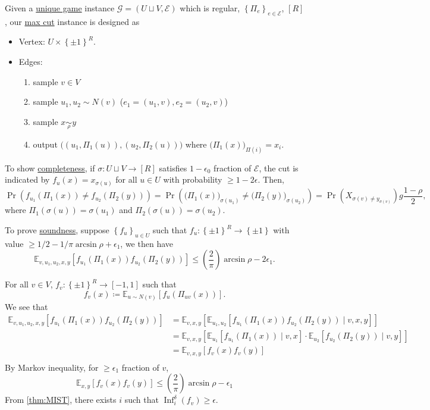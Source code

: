 Given a \hyperref[prb:unique-game]{unique game} instance \(\mathcal{G} = (U \sqcup V , \mathcal{E} )\) which is regular, \(\left\{ \Pi _e \right\}_{e\in \mathcal{E} } \), \([R]\), our \hyperref[prb:max-cut]{max cut} instance is designed as
\begin{itemize}
	\item Vertex: \(U \times \left\{ \pm 1 \right\} ^R\).
	\item Edges:
	      \begin{enumerate}
		      \item sample \(v\in V\)
		      \item sample \(u_1, u_2 \sim N(v)\) (\(e_1 = (u_1, v), e_2 = (u_2, v)\))
		      \item sample \(x \underset{\rho }{\sim } y\)
		      \item output \(\big( (u_1, \Pi _1(u)), (u_2, \Pi _2(u))\big)\) where \(\big(\Pi _1(x)\big)_{\Pi (i)} = x_i\).
	      \end{enumerate}
\end{itemize}

To show \hyperref[def:completeness]{completeness}, if \(\sigma \colon U \sqcup V \to [R]\) satisfies \(1 - \epsilon _0\) fraction of \(\mathcal{E} \), the cut is indicated by \(f_u(x) = x_{\sigma (u)}\) for all \(u\in U\) with probability \(\geq 1 - 2 \epsilon \). Then,
\[
	\Pr_{}(f_{u_1}(\Pi _1(x)) \neq f_{u_2}(\Pi _2(y)))
	= \Pr_{}(\big(\Pi _1(x)\big)_{\sigma (u_1)} \neq \big(\Pi _2(y)\big)_{\sigma (u_2)})
	= \Pr_{}(X_{\sigma (v) \neq y_{\sigma (v)}})
	g \frac{1-\rho }{2},
\]
where \(\Pi _1(\sigma (u)) = \sigma (u_1)\) and \(\Pi _2(\sigma (u)) = \sigma (u_2)\).

To prove \hyperref[def:soundness]{soundness}, suppose \(\left\{ f_u \right\} _{u\in U}\) such that \(f_u\colon \left\{ \pm 1 \right\} ^R \to \left\{ \pm 1 \right\} \) with value \(\geq 1 / 2 - 1 / \pi \arcsin \rho + \epsilon _1\), we then have
\[
	\mathbb{E}_{v, u_1, u_2, x, y}\left[f_{u_1}(\Pi _1(x)) f_{u_2}(\Pi _2(y)) \right]
	\leq \left( \frac{2}{\pi } \right) \arcsin \rho - 2\epsilon _1.
\]

For all \(v\in V\), \(f_v \colon \left\{ \pm 1 \right\} ^R \to [-1, 1]\) such that
\[
	f_v(x) \coloneqq \mathbb{E}_{u \sim N(v)}\left[f_u (\Pi _{uv} (x) ) \right].
\]
We see that
\[
	\begin{split}
		\mathbb{E}_{v, u_1, u_2, x, y}\left[f_{u_1}(\Pi _1(x)) f_{u_2}(\Pi _2(y)) \right]
		&= \mathbb{E}_{v, x, y}\left[ \mathbb{E}_{u_1, u_2}\left[ f_{u_1}(\Pi _1(x)) f_{u_2}(\Pi _2(y)) \mid v, x, y\right] \right] \\
		&= \mathbb{E}_{v, x, y}\left[ \mathbb{E}_{u_1}\left[ f_{u_1}(\Pi _1(x)) \mid v, x\right] \cdot \mathbb{E}_{u_2}\left[f_{u_2}(\Pi _2(y)) \mid v, y \right] \right] \\
		&= \mathbb{E}_{v, x, y}\left[ f_v(x) f_v(y) \right] \\
	\end{split}
\]
By Markov inequality, for \(\geq \epsilon _1\) fraction of \(v\),
\[
	\mathbb{E}_{x, y}\left[f_v(x) f_v(y) \right] \leq \left( \frac{2}{\pi } \right) \arcsin \rho - \epsilon _1
\]
From \autoref{thm:MIST}, there exists \(i\) such that \(\mathop{\mathrm{Inf}}_i^\delta (f_v)\geq \epsilon\).

